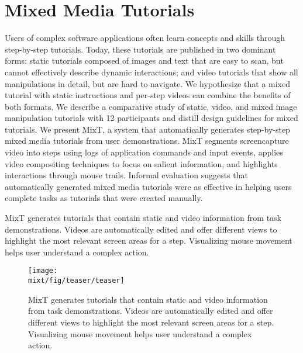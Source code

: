 \chapter{Mixed Media Tutorials}

Users of complex software applications often learn concepts and skills through step-by-step tutorials. Today, these tutorials are published in two dominant forms: static tutorials composed of images and text that are easy to scan, but cannot effectively describe dynamic interactions; and video tutorials that show all manipulations in detail, but are hard to navigate. We hypothesize that a mixed tutorial with static instructions and per-step videos can combine the benefits of both formats. We describe a comparative study of static, video, and mixed image manipulation tutorials with 12 participants and distill design guidelines for mixed tutorials. We present MixT, a system that automatically generates step-by-step mixed media tutorials from user demonstrations. MixT segments screencapture video into steps using logs of application commands and input events, applies video compositing techniques to focus on salient information, and highlights interactions through mouse trails. Informal evaluation suggests that automatically generated mixed media tutorials were as effective in helping users complete tasks as tutorials that were created manually.

MixT generates tutorials that contain static and video information from task demonstrations. Videos are automatically edited and offer different views to highlight the most relevant screen areas for a step. Visualizing mouse movement helps user understand a complex action.

\begin{figure*}[t]
  \centering
  \texttt{[image: \\mixt/fig/teaser/teaser]}
  \caption{MixT generates tutorials that contain static and video information from task demonstrations. Videos are automatically edited and offer different views to highlight the most relevant screen areas for a step. Visualizing mouse movement helps user understand a complex action.}
  \label{fig:mixt_teaser}
\end{figure*}











